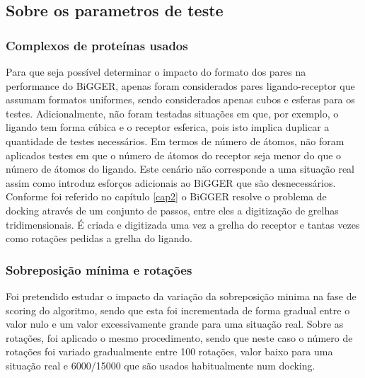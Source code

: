 \subsection{Sobre os parametros de teste}
\subsubsection{Complexos de proteínas usados}
Para que seja possível determinar o impacto do formato dos pares na performance do BiGGER, apenas foram considerados pares ligando-receptor que assumam formatos uniformes, sendo considerados apenas cubos e esferas para os testes. Adicionalmente, não foram testadas situações em que, por exemplo, o ligando tem forma cúbica e o receptor esferica, pois isto implica duplicar a quantidade de testes necessários. Em termos de número de átomos, não foram aplicados testes em que o número de átomos do receptor seja menor do que  o número de átomos do ligando. Este cenário não corresponde a uma situação real assim como introduz esforços adicionais ao BiGGER que são desnecessários. Conforme foi referido no capítulo \ref{cap2} o BiGGER resolve o problema de docking através de um conjunto de passos, entre eles a digitização de grelhas tridimensionais. É criada e digitizada uma vez a grelha do receptor e tantas vezes como rotações pedidas a grelha do ligando.
\subsubsection{Sobreposição mínima e rotações}
Foi pretendido estudar o impacto da variação da sobreposição minima na fase de scoring do algoritmo, sendo que esta foi incrementada de forma gradual entre o valor nulo e um valor excessivamente grande para uma situação real. Sobre as rotações, foi aplicado o mesmo procedimento, sendo que neste caso o número de rotações foi variado gradualmente entre 100 rotações, valor baixo para uma situação real e 6000/15000 que são usados habitualmente num docking.

